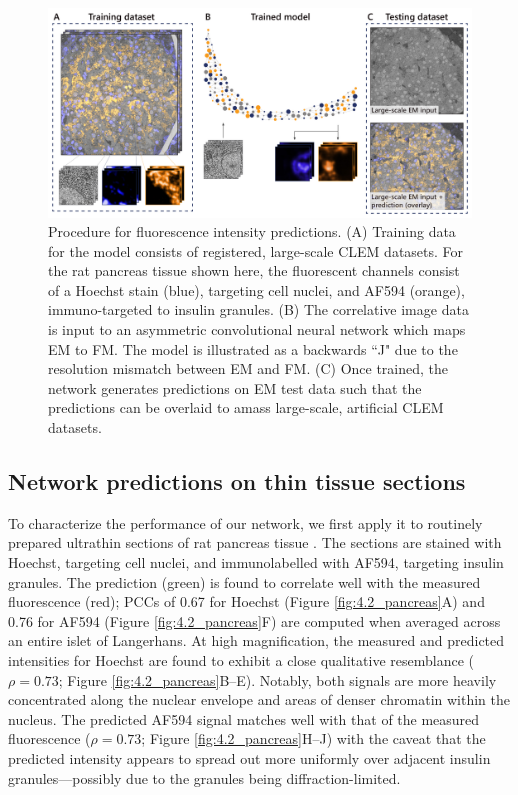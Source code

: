 \begin{figure}[!tb]
    \centering
    \includegraphics[width=\linewidth]{chapter-4/figures_PDF/fig4-1_overview.pdf}
    \caption{Procedure for fluorescence intensity predictions.
    (A) Training data for the model consists of registered, large-scale CLEM datasets. For the rat pancreas tissue shown here, the fluorescent channels consist of a Hoechst stain (blue), targeting cell nuclei, and AF594 (orange), immuno-targeted to insulin granules.
    (B) The correlative image data is input to an asymmetric convolutional neural network which maps EM to FM. The model is illustrated as a backwards ``J" due to the resolution mismatch between EM and FM.
    (C) Once trained, the network generates predictions on EM test data such that the predictions can be overlaid to amass large-scale, artificial CLEM datasets.}
    \label{fig:4.1_overview}
\end{figure}


\subsection{Network predictions on thin tissue sections}
\label{sec:4results_pancreas}

To characterize the performance of our network, we first apply it to routinely prepared ultrathin sections of rat pancreas tissue \cite{ravelli2013destruction}. The sections are stained with Hoechst, targeting cell nuclei, and immunolabelled with AF594, targeting insulin granules. The prediction (green) is found to correlate well with the measured fluorescence (red); PCCs of 0.67 for Hoechst (Figure \ref{fig:4.2_pancreas}A) and 0.76 for AF594 (Figure \ref{fig:4.2_pancreas}F) are computed when averaged across an entire islet of Langerhans. At high magnification, the measured and predicted intensities for Hoechst are found to exhibit a close qualitative resemblance ($\rho\!=\!\text{0.73}$; Figure \ref{fig:4.2_pancreas}B--E). Notably, both signals are more heavily concentrated along the nuclear envelope and areas of denser chromatin within the nucleus. The predicted AF594 signal matches well with that of the measured fluorescence ($\rho\!=\!\text{0.73}$; Figure \ref{fig:4.2_pancreas}H--J) with the caveat that the predicted intensity appears to spread out more uniformly over adjacent insulin granules---possibly due to the granules being diffraction-limited.

